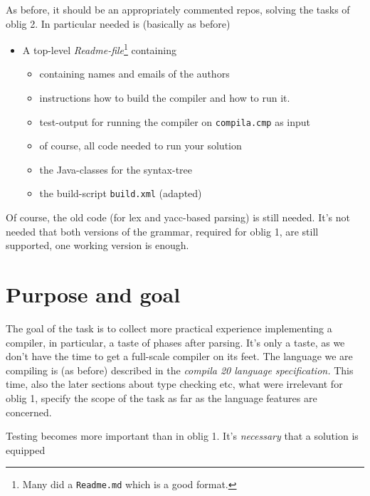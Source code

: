 \documentclass[11pt,freeform]{handout}[2014/08/13]
\begin{document}
As before, it should be an appropriately commented repos, solving the tasks
of oblig 2. In particular needed is (basically as before)


\begin{itemize}
\item A top-level \emph{Readme-file}\footnote{Many did a \texttt{Readme.md}
    which is a good format.} containing
  \begin{itemize}
  \item  containing names and emails of the authors
  \item instructions how to build the compiler and how to run it.
  \item test-output for running the compiler on \texttt{compila.cmp} as
    input
  \item of course, all code needed to run your solution 
  \item the Java-classes for the syntax-tree
  \item the build-script \texttt{build.xml} (adapted)
  \end{itemize}
\end{itemize}

Of course, the old code (for lex and yacc-based parsing) is still
needed. It's not needed that both versions of the grammar, required for
oblig 1, are still supported, one working version is enough.



\section{Purpose and goal}
\label{sec:x}

The goal of the task is to collect more practical experience implementing a
compiler, in particular, a taste of phases after parsing. It's only a
taste, as we don't have the time to get a full-scale compiler on its
feet. The language we are compiling is (as before) described in the
\emph{compila 20 language specification.} This time, also the later sections
about type checking etc, what were irrelevant for oblig 1, specify the
scope of the task as far as the language features are concerned.


Testing becomes more important than in oblig 1. It's \emph{necessary} that
a solution is equipped
\end{document}
